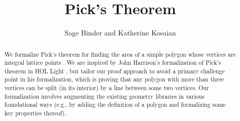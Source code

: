 \documentclass[11pt,a4paper]{article}
\begin{document}
\title{Pick's Theorem}
\author{Sage Binder and Katherine Kosaian}
\maketitle

\begin{abstract}
    We formalize Pick's theorem for finding the area of a simple
    polygon whose vertices are integral lattice points \cite{grunbaum1993pick}.
    We are inspired by John Harrison's formalization of
    Pick's theorem in HOL Light \cite{DBLP:journals/mscs/Harrison11}, but tailor our proof approach
    to avoid a primary challenge point in his formalization,
    which is proving that any polygon with more than three
    vertices can be split (in its interior) by a line between
    some two vertices.
    Our formalization involves augmenting the existing geometry
    libraries in various foundational ways
    (e.g., by adding the definition of a polygon and
    formalizing some key properties thereof). 
\end{abstract}

\tableofcontents





\end{document}
